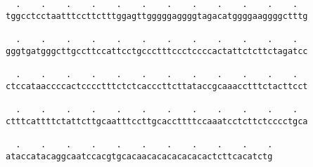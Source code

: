 \documentclass{article}
\begin{document}
\begin{Verbatim}
  .    .    .    .    .    .    .    .    .    .    .    .  
tggcctcctaatttccttctttggagttgggggaggggtagacatggggaaggggctttg
                                                            
  .    .    .    .    .    .    .    .    .    .    .    .  
gggtgatgggcttgccttccattcctgccctttccctccccactattctcttctagatcc
                                                            
  .    .    .    .    .    .    .    .    .    .    .    .  
ctccataaccccactcccctttctctcacccttcttataccgcaaacctttctacttcct
                                                            
  .    .    .    .    .    .    .    .    .    .    .    .  
ctttcattttctattcttgcaatttccttgcaccttttccaaatcctcttctcccctgca
                                                            
  .    .    .    .    .    .    .    .    .    .    .
ataccatacaggcaatccacgtgcacaacacacacacacactcttcacatctg
                                                     
                                                     
\end{Verbatim}
\end{document}
